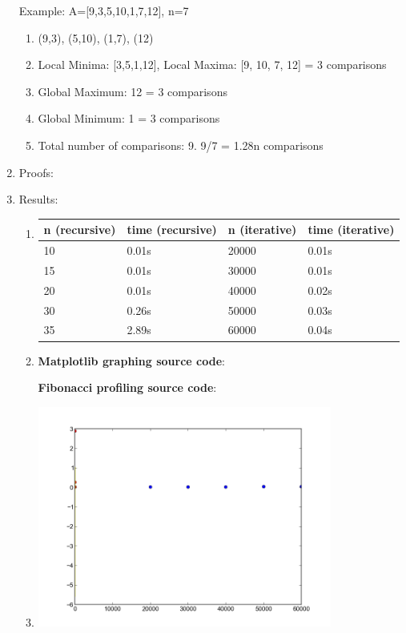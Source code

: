\documentclass{article}
\begin{document}
\begin{enumerate}
     Example: A=[9,3,5,10,1,7,12], n=7
     \begin{enumerate}
       \item (9,3), (5,10), (1,7), (12)
       \item Local Minima: [3,5,1,12], Local Maxima: [9, 10, 7, 12] = 3 comparisons
       \item Global Maximum: 12 = 3 comparisons
       \item Global Minimum: 1 = 3 comparisons 
       \item Total number of comparisons: 9.  9/7 = 1.28n comparisons
     \end{enumerate}
  \item Proofs:
  \item Results:
    \begin{enumerate}
      \item \begin{tabular}{|l|l|l|l|}
        \hline
        \multicolumn{1}{c}{\bfseries n (recursive)} & \multicolumn{1}{c}{\bfseries time (recursive)} & \multicolumn{1}{c}{\bfseries n (iterative)} & \multicolumn{1}{c}{\bfseries time (iterative)} \\ \hline
        10 & 0.01s & 20000 & 0.01s \\ \hline
        15 & 0.01s & 30000 & 0.01s \\ \hline
        20 & 0.01s & 40000 & 0.02s \\ \hline
        30 & 0.26s & 50000 & 0.03s \\ \hline
        35 & 2.89s & 60000 & 0.04s \\ \hline
      \end{tabular}
      \item \textbf{Matplotlib graphing source code}:
      
      \textbf{Fibonacci profiling source code}:
      
      \item \includegraphics[width=0.8\textwidth]{plot.png}


\end{enumerate}
\end{enumerate}
\end{document}
